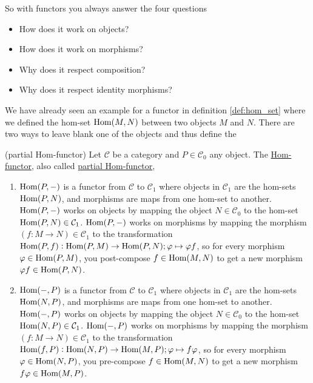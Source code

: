 \noindent So with functors you always answer the four questions
\begin{itemize}\label{four_functor_questions}
\item How does it work on objects?
\item How does it work on morphisms?
\item Why does it respect composition?
\item Why does it respect identity morphisms?
\end{itemize}

We have already seen an example for a functor in definition \ref{def:hom_set} where we defined the hom-set $\textup{Hom}(M,N)$ between two
objects $M$ and $N$. There are two ways to leave blank one of the objects and thus define the 

\begin{example}{(partial Hom-functor)}\label{ex:hom_functor}
Let $\mathcal{C}$ be a category and $P \in \mathcal{C}_{0}$ any object. The \ul{Hom-functor}, also called \ul{partial Hom-functor},
\begin{enumerate}
\item $\textup{Hom}(P,-)$ is a functor from $\mathcal{C}$ to $\mathcal{C}_{1}$ where objects in $\mathcal{C}_{1}$ are the hom-sets 
$\textup{Hom}(P,N)$, and morphisms are maps from one hom-set to another.
$\textup{Hom}(P,-)$ works on objects by mapping the object $N \in \mathcal{C}_{0}$ to
the hom-set $\textup{Hom}(P,N) \in \mathcal{C}_{1}$.
$\textup{Hom}(P,-)$ works on morphisms by mapping the morphism $(f : M \rightarrow N ) \in \mathcal{C}_{1}$ to the transformation
$\textup{Hom}(P,f) : \textup{Hom}(P,M) \rightarrow \textup{Hom}(P,N); \varphi \mapsto \varphi f$, so for every morphism
$\varphi \in \textup{Hom}(P,M)$, you post-compose $f \in \textup{Hom}(M,N)$ to get a new morphism $\varphi f \in \textup{Hom}(P,N)$.

\item $\textup{Hom}(-,P)$ is a functor from $\mathcal{C}$ to $\mathcal{C}_{1}$ where objects in $\mathcal{C}_{1}$ are the hom-sets 
$\textup{Hom}(N,P)$, and morphisms are maps from one hom-set to another.
$\textup{Hom}(-,P)$ works on objects by mapping the object $N \in \mathcal{C}_{0}$ to
the hom-set $\textup{Hom}(N,P) \in \mathcal{C}_{1}$.
$\textup{Hom}(-,P)$ works on morphisms by mapping the morphism $(f : M \rightarrow N ) \in \mathcal{C}_{1}$ to the transformation
$\textup{Hom}(f,P) : \textup{Hom}(N,P) \rightarrow \textup{Hom}(M,P); \varphi \mapsto f\varphi$, so for every morphism
$\varphi \in \textup{Hom}(N,P)$, you pre-compose $f \in \textup{Hom}(M,N)$ to get a new morphism $f\varphi \in \textup{Hom}(M,P)$.
\end{enumerate}


\end{example}
